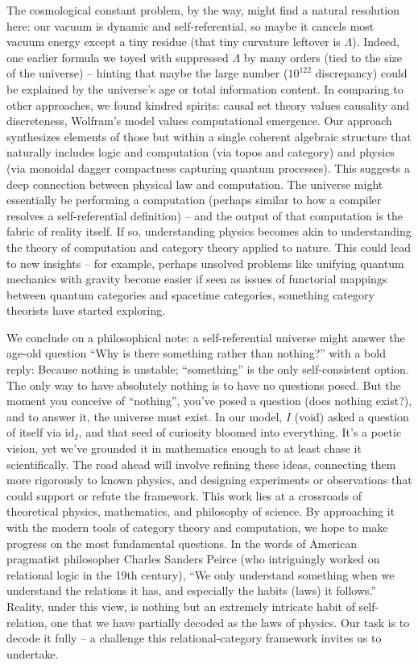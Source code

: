 \documentclass{article}
\begin{document}
The cosmological constant problem, by the way, might find a natural resolution here: our vacuum is dynamic and self-referential, so maybe it cancels most vacuum energy except a tiny residue (that tiny curvature leftover is $\Lambda$). Indeed, one earlier formula we toyed with suppressed $\Lambda$ by many orders (tied to the size of the universe)\cite{carlip2017} – hinting that maybe the large number ($10^{122}$ discrepancy) could be explained by the universe’s age or total information content. In comparing to other approaches, we found kindred spirits: causal set theory values causality and discreteness\cite{bombelli1987}, Wolfram’s model values computational emergence\cite{wolfram2020}. Our approach synthesizes elements of those but within a single coherent algebraic structure that naturally includes logic and computation (via topos and category) and physics (via monoidal dagger compactness capturing quantum processes\cite{abramsky2009}). This suggests a deep connection between physical law and computation. The universe might essentially be performing a computation (perhaps similar to how a compiler resolves a self-referential definition) – and the output of that computation is the fabric of reality itself. If so, understanding physics becomes akin to understanding the theory of computation and category theory applied to nature. This could lead to new insights – for example, perhaps unsolved problems like unifying quantum mechanics with gravity become easier if seen as issues of functorial mappings between quantum categories and spacetime categories, something category theorists have started exploring. 

We conclude on a philosophical note: a self-referential universe might answer the age-old question “Why is there something rather than nothing?” with a bold reply: Because nothing is unstable; “something” is the only self-consistent option. The only way to have absolutely nothing is to have no questions posed. But the moment you conceive of “nothing”, you’ve posed a question (does nothing exist?), and to answer it, the universe must exist. In our model, $I$ (void) asked a question of itself via $\mathrm{id}_I$, and that seed of curiosity bloomed into everything. It’s a poetic vision, yet we’ve grounded it in mathematics enough to at least chase it scientifically. The road ahead will involve refining these ideas, connecting them more rigorously to known physics, and designing experiments or observations that could support or refute the framework. This work lies at a crossroads of theoretical physics, mathematics, and philosophy of science. By approaching it with the modern tools of category theory and computation, we hope to make progress on the most fundamental questions. In the words of American pragmatist philosopher Charles Sanders Peirce (who intriguingly worked on relational logic in the 19th century), “We only understand something when we understand the relations it has, and especially the habits (laws) it follows.” Reality, under this view, is nothing but an extremely intricate habit of self-relation, one that we have partially decoded as the laws of physics. Our task is to decode it fully – a challenge this relational-category framework invites us to undertake.




\end{document}
